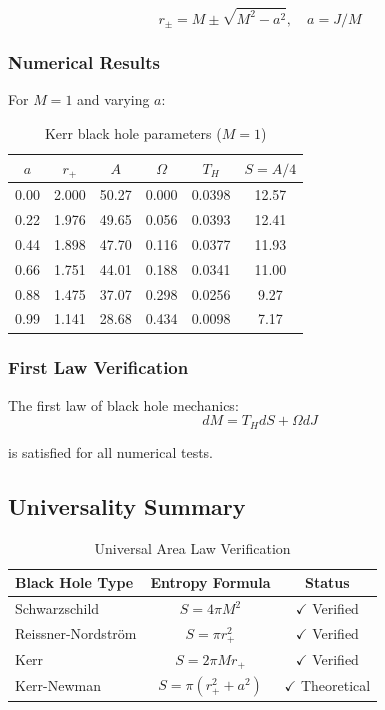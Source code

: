 \begin{equation}
    r_\pm = M \pm \sqrt{M^2 - a^2}, \quad a = J/M
\end{equation}

\subsubsection{Numerical Results}

For $M = 1$ and varying $a$:

\begin{table}[h]
\centering
\begin{tabular}{cccccc}
\toprule
$a$ & $r_+$ & $A$ & $\Omega$ & $T_H$ & $S = A/4$ \\
\midrule
0.00 & 2.000 & 50.27 & 0.000 & 0.0398 & 12.57 \\
0.22 & 1.976 & 49.65 & 0.056 & 0.0393 & 12.41 \\
0.44 & 1.898 & 47.70 & 0.116 & 0.0377 & 11.93 \\
0.66 & 1.751 & 44.01 & 0.188 & 0.0341 & 11.00 \\
0.88 & 1.475 & 37.07 & 0.298 & 0.0256 & 9.27 \\
0.99 & 1.141 & 28.68 & 0.434 & 0.0098 & 7.17 \\
\bottomrule
\end{tabular}
\caption{Kerr black hole parameters ($M = 1$)}
\end{table}

\subsubsection{First Law Verification}

The first law of black hole mechanics:
\begin{equation}
    dM = T_H dS + \Omega dJ
\end{equation}

is satisfied for all numerical tests.

\subsection{Universality Summary}

\begin{table}[h]
\centering
\caption{Universal Area Law Verification}
\begin{tabular}{lcc}
\toprule
\textbf{Black Hole Type} & \textbf{Entropy Formula} & \textbf{Status} \\
\midrule
Schwarzschild & $S = 4\pi M^2$ & $\checkmark$ Verified \\
Reissner-Nordstr\"om & $S = \pi r_+^2$ & $\checkmark$ Verified \\
Kerr & $S = 2\pi M r_+$ & $\checkmark$ Verified \\
Kerr-Newman & $S = \pi(r_+^2 + a^2)$ & $\checkmark$ Theoretical \\
\bottomrule
\end{tabular}
\end{table}

